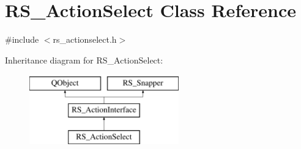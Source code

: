 \hypertarget{classRS__ActionSelect}{\section{R\-S\-\_\-\-Action\-Select Class Reference}
\label{classRS__ActionSelect}
}


{\ttfamily \#include $<$rs\-\_\-actionselect.\-h$>$}

Inheritance diagram for R\-S\-\_\-\-Action\-Select\-:\begin{figure}[H]
\begin{center}
\leavevmode
\includegraphics[height=3.000000cm]{classRS__ActionSelect}
\end{center}
\end{figure}
